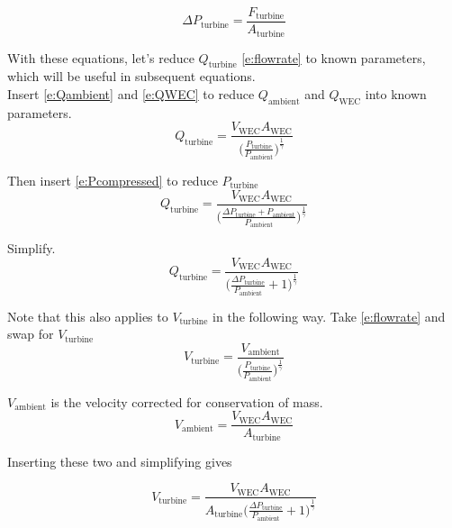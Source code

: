 \documentclass[conf]{new-aiaa}
\begin{document}
\begin{equation}
\label{e:Fturb}
\Delta P_\text{turbine} = \frac{F_\text{turbine}}{A_\text{turbine}}
\end{equation}

With these equations, let's reduce $Q_\text{turbine}$ \cref {e:flowrate} to known parameters, which will be useful in subsequent equations.\\


Insert \cref{e:Qambient} and \cref{e:QWEC} to reduce $Q_\text{ambient}$ and $Q_\text{WEC}$ into known parameters.
    \begin{equation}
\label{e:Qturb1}
Q_\text{turbine}  =  \frac{V_\text{WEC} A_\text{WEC} }{\bigg(\frac{P_\text{turbine}}{P_\text{ambient}}\bigg)^\frac{1}{\gamma}}
\end{equation}

Then insert \cref{e:Pcompressed} to reduce $P_\text{turbine}$ 
    \begin{equation}
\label{e:Qturb2}
Q_\text{turbine} =  \frac{V_\text{WEC} A_\text{WEC} }{\bigg(\frac{\Delta P_\text{turbine} + P_\text{ambient} }{P_\text{ambient}}\bigg)^\frac{1}{\gamma}}
\end{equation}

Simplify.
    \begin{equation}
\label{e:Qturb3}
Q_\text{turbine} =  \frac{V_\text{WEC} A_\text{WEC}} {\bigg(\frac{\Delta P_\text{turbine} }{P_\text{ambient} } + 1\bigg)^\frac{1}{\gamma}}
\end{equation}

Note that this also applies to $V_\text{turbine}$ in the following way.  Take \cref{e:flowrate} and swap for $V_\text{turbine}$
    \begin{equation}
\label{e:V_turb1}
V_\text{turbine} = \frac{V_\text{ambient}}{\bigg(\frac{P_\text{turbine}}{P_\text{ambient}}\bigg)^\frac{1}{\gamma}}
\end{equation}

$V_\text{ambient}$ is the velocity corrected for conservation of mass.
 \begin{equation}
\label{e:Vambient}
V_\text{ambient} = \frac{V_\text{WEC} A_\text{WEC}} {A_\text{turbine}}
\end{equation}

Inserting these two and simplifying gives

    \begin{equation}
\label{e:V_turb2}
V_\text{turbine} =  \frac{V_\text{WEC} A_\text{WEC}} {A_\text{turbine} \bigg(\frac{\Delta P_\text{turbine} }{P_\text{ambient} } + 1\bigg)^\frac{1}{\gamma}}
\end{equation}
\end{document}
